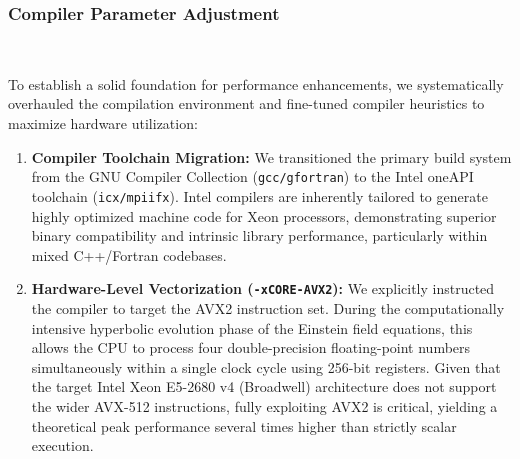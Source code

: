 



\subsubsection{Compiler Parameter Adjustment}
\

To establish a solid foundation for performance enhancements, we systematically overhauled the compilation environment and fine-tuned compiler heuristics to maximize hardware utilization:
\begin{enumerate}
    \item \textbf{Compiler Toolchain Migration:} We transitioned the primary build system from the GNU Compiler Collection (\texttt{gcc/gfortran}) to the Intel oneAPI toolchain (\texttt{icx/mpiifx}). 
    Intel compilers are inherently tailored to generate highly optimized machine code for Xeon processors, demonstrating superior binary compatibility and intrinsic library performance, particularly within mixed C++/Fortran codebases.

    \item \textbf{Hardware-Level Vectorization (\texttt{-xCORE-AVX2}):} We explicitly instructed the compiler to target the AVX2 instruction set. 
    During the computationally intensive hyperbolic evolution phase of the Einstein field equations, this allows the CPU to process four double-precision floating-point numbers simultaneously within a single clock cycle using 256-bit registers. 
    Given that the target Intel Xeon E5-2680 v4 (Broadwell) architecture does not support the wider AVX-512 instructions, fully exploiting AVX2 is critical, yielding a theoretical peak performance several times higher than strictly scalar execution.
    
\end{enumerate}

